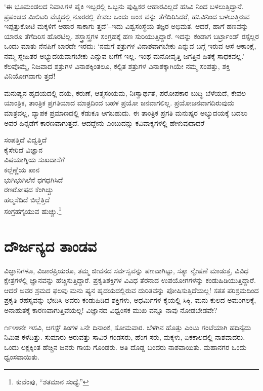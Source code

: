 ‘ಈ ಭೂಮಂಡಲದ ನಿವಾಸಿಗಳ ಪೈಕಿ ಇಬ್ಬರಲ್ಲಿ ಒಬ್ಬನು ಪುಷ್ಟಿಕರ ಆಹಾರವಿಲ್ಲದೆ ಹಸಿವಿ ನಿಂದ ಬಳಲುತ್ತಿದ್ದಾನೆ. ಪ್ರಪಂಚದ ಮಿಲಿಟರಿ ವೆಚ್ಚದಲ್ಲಿ ನೂರರಲ್ಲಿ ಕೇವಲ ಒಂದು ಅಂಶ ವನ್ನು ತೆಗೆದಿರಿಸಿದರೆ, ಹಸಿವಿನಿಂದ ಬಳಲುತ್ತಿರುವ ಇಪ್ಪತ್ತುಕೋಟಿ ಮಕ್ಕಳಿಗೆ ಆಹಾರ ಸಾಕಾಗು ತ್ತದೆ’–ಇದು ವಿಶ್ವಸಂಸ್ಥೆಯ ತಜ್ಞರ ಅಭಿಮತ. ಆದರೆ, ಹಾಗೆ ಹಣವನ್ನು ಯಾರೂ ತೆಗೆದಿರಿಸ ಹೊರಟಿಲ್ಲ. ಶಸ್ತ್ರಾಸ್ತ್ರಗಳ ಸಂಗ್ರಹಕ್ಕೆ ಹಣ ಸುರಿಯುತ್ತಿದ್ದಾರೆ. ಇದನ್ನು ಕಂಡಾಗ ಬರ್ಟ್ರಾಂಡ್ ರಸ್ಸೆಲ್ಲರ ಒಂದು ಮಾತು ನೆನಪಿಗೆ ಬಾರದೇ ಇರದು: ‘ನಮಗೆ ಶತ್ರುಗಳ ವಿನಾಶವಾಗಬೇಕು ಎನ್ನುವ ಬಗ್ಗೆ ಇರುವ ಆಸೆ ಆಕಾಂಕ್ಷೆ, ನಮ್ಮ ಸ್ನೇಹಿತರ ಅಭ್ಯುದಯವಾಗಬೇಕು ಎನ್ನುವ ಬಗೆಗೆ ಇಲ್ಲ. ಇಂಥ ಮನೋವೃತ್ತಿ ಜಗತ್ತಿನ ಹಿತಕ್ಕೆ ಸಾಧಕವಲ್ಲ.’ ಕೆಲವೊಮ್ಮೆ, ನಿಜವಾದ ಶತ್ರುಗಳ ವಿನಾಶಕ್ಕಿಂತಲೂ, ಕಲ್ಪಿತ ಶತ್ರುಗಳ ವಿನಾಶಕ್ಕಾಗಿಯೇ ನಮ್ಮ ಸಂಪತ್ತು, ಶಕ್ತಿ ವಿನಿಯೋಗವಾಗು ತ್ತದೆ!

ಮನುಷ್ಯನ ಹೃದಯದಲ್ಲಿ ದಯೆ, ಕರುಣೆ, ಆತ್ಮಸಂಯಮ, ನಿಃಸ್ವಾರ್ಥತೆ, ಪರೋಪಕಾರ ಬುದ್ಧಿ ಬೆಳೆಯದೆ, ಕೇವಲ ಯಾಂತ್ರಿಕ, ತಾಂತ್ರಿಕ ಪ್ರಗತಿಯಾದ ಮಾತ್ರದಿಂದ ಬಹಳ ಪ್ರಯೋ ಜನವಾಗಲಿಲ್ಲ. ಪ್ರಯೋಜನವಾಗದಿರುವುದು ಮಾತ್ರವಲ್ಲ, ವ್ಯಾಪಕ ಪ್ರಮಾಣದಲ್ಲಿ ಕೆಡುಕೂ ಆಗಬಹುದು. ಈ ತಾಂತ್ರಿಕ ಪ್ರಗತಿ ಮನುಷ್ಯರ ಅಭ್ಯುದಯಕ್ಕೆ ಬದಲು ಅವರ ಹಿನ್ನಡೆಗೆ ಕಾರಣವಾಗುತ್ತದೆ. ಆದದ್ದೇನು ಎಂಬುದನ್ನು ಕವಿವಾಕ್ಯಗಳಲ್ಲಿ ಹೇಳುವುದಾದರೆ–

\begin{myquote}
ಸಂಪತ್ತಿದೆ ವಿದ್ವತ್ತಿದೆ\\
 ಕೈಸೇರಿದೆ ವಿಜ್ಞಾನ\\
 ವಿಷಯಾಗ್ನಿಯ ಸುಖದಾಸೆಗೆ\\
 ಕಲ್ಲೆಣ್ಣೆಯ ಪಾನ\\ 
 ಭುಗಿಭುಗಿಲೆನೆ ಧಗಧಗಿಸಿದೆ\\
 ರಣರೋಷದ ಕೆಂಗಿಚ್ಚು\\ 
 ಹಲ್ಮಸೆದಿದೆ ಬಿಲ್ಲೆತ್ತಿದೆ\\ 
 ಸಂಗ್ರಹಗೈಯುವ ಹುಚ್ಚು.\footnote{ಕುವೆಂಪು, “ಶತಮಾನ ಸಂಧ್ಯೆ.”}
\end{myquote}


\section{ದೌರ್ಜನ್ಯದ ತಾಂಡವ}

ವಿಜ್ಞಾನಿಗಳೂ, ವಿಚಾರಪ್ರಿಯರೂ, ತಮ್ಮ ಜೀವನದ ಸರ್ವಸ್ವವನ್ನು ಪಣವಾಗಿಟ್ಟು, ಸತ್ಯಾ ನ್ವೇಷಣೆ ಮಾಡುತ್ತ, ವಿವಿಧ ಕ್ಷೇತ್ರಗಳಲ್ಲಿ ಜ್ಞಾನವನ್ನು ಹೆಚ್ಚಿಸುತ್ತಿದ್ದಾರೆ. ಪ್ರಕೃತಿಶಕ್ತಿಗಳ ವಿವಿಧ ತೆರನಾದ ಉಪಯೋಗಗಳನ್ನು ಕಂಡುಹಿಡಿಯುತ್ತಿದ್ದಾರೆ. ಆದರೆ ಅವರ ಶ್ರಮದ ಫಲವು ಮನು ಷ್ಯನ ಹೃದಯದಲ್ಲಿರುವ ದುರಿತವನ್ನು ಪೋಷಿಸುತ್ತಿದೆಯಲ್ಲ! ಸತತ ಪರಿಶ್ರಮದಿಂದ ಪ್ರಕೃತಿ ರಹಸ್ಯವನ್ನು ಭೇದಿಸಿ ಅವರು ಕಂಡುಹಿಡಿದ ಶಕ್ತಿಗಳು, ಅಧರ್ಮಿಗಳ ಕೈಯಲ್ಲಿ ಸಿಕ್ಕಿ, ಮನು ಕುಲದ ಅಮಂಗಲಕ್ಕೆ, ಅನಾಹುತಕ್ಕೆ ಕಾರಣವಾಗುತ್ತಿವೆಯಲ್ಲ! ವಿಜ್ಞಾನದ ವಿಧ್ವಂಸಕ ಮುಖ ವನ್ನೂ ನಾವು ನೋಡಬೇಡವೇ?

೧೯೪೫ನೇ ಇಸವಿ, ಆಗಸ್ಟ್ ತಿಂಗಳ ೬ನೇ ದಿನಾಂಕ, ಸೋಮವಾರ. ಬೆಳಗಿನ ಹೊತ್ತು ಎಂಟು ಗಂಟೆಯಾಗಿ ಹದಿನೈದು ನಿಮಿಷ ಕಳೆದಿತ್ತು. ಸುಮಾರು ಅರುವತ್ತು ಸಾವಿರ ಗಂಡಸರು, ಹೆಂಗ ಸರು, ಮಕ್ಕಳು, ಏಕಕಾಲದಲ್ಲಿ ನಾಶವಾದರು. ಒಂದು ಲಕ್ಷಕ್ಕಿಂತ ಹೆಚ್ಚಿನ ಜನರು ಗಾಯ ಗೊಂಡರು. ಅತಿ ದೊಡ್ಡ ಬಂದರು ನಾಶವಾಯಿತು. ಮಹಾನಗರ ಒಂದು ಧ್ವಂಸವಾಯಿತು.

